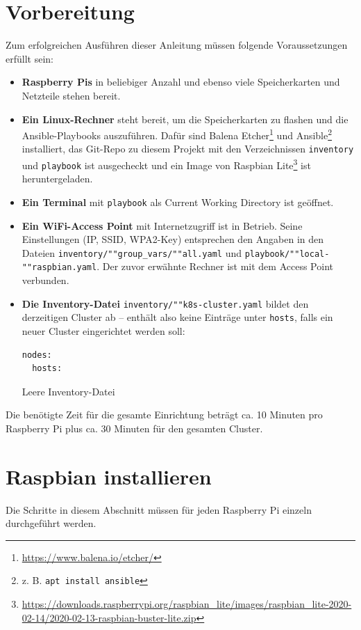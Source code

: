 \section{Vorbereitung}
Zum erfolgreichen Ausführen dieser Anleitung müssen folgende Voraussetzungen erfüllt sein:

\begin{itemize}
    \item \textbf{Raspberry Pis} in beliebiger Anzahl und ebenso viele Speicherkarten und Netzteile stehen bereit.
    \item \textbf{Ein Linux-Rechner} steht bereit, um die Speicherkarten zu flashen und die Ansible-Playbooks auszuführen. Dafür sind Balena Etcher\footnote{\url{https://www.balena.io/etcher/}} und Ansible\footnote{z. B. \texttt{apt install ansible}} installiert, das Git-Repo zu diesem Projekt mit den Verzeichnissen \texttt{inventory} und \texttt{playbook} ist ausgecheckt und ein Image von Raspbian Lite\footnote{\url{https://downloads.raspberrypi.org/raspbian_lite/images/raspbian_lite-2020-02-14/2020-02-13-raspbian-buster-lite.zip}} ist heruntergeladen.
    \item \textbf{Ein Terminal} mit \texttt{playbook} als Current Working Directory ist geöffnet.
    \item \textbf{Ein WiFi-Access Point} mit Internetzugriff ist in Betrieb. Seine Einstellungen (IP, SSID, WPA2-Key) entsprechen den Angaben in den Dateien \texttt{inventory/""group\_vars/""all.yaml} und \texttt{playbook/""local-""raspbian.yaml}. Der zuvor erwähnte Rechner ist mit dem Access Point verbunden.
    \item \textbf{Die Inventory-Datei} \texttt{inventory/""k8s-cluster.yaml} bildet den derzeitigen Cluster ab -- enthält also keine Einträge unter \texttt{hosts}, falls ein neuer Cluster eingerichtet werden soll:

        \begin{lstlisting}
nodes:
  hosts:
        \end{lstlisting}
        \caption{Leere Inventory-Datei}
\end{itemize}

Die benötigte Zeit für die gesamte Einrichtung beträgt ca. 10 Minuten pro Raspberry Pi plus ca. 30 Minuten für den gesamten Cluster.

\section{Raspbian installieren}
Die Schritte in diesem Abschnitt müssen für jeden Raspberry Pi einzeln durchgeführt werden.

